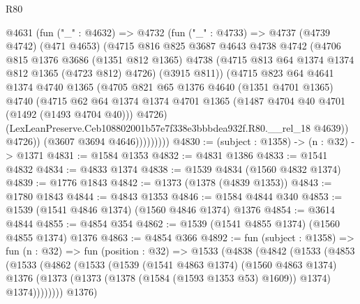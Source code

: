 \begin{lexlean}{R80}
\begin{coremodule}
              @4631
                (fun ("_" : @4632) =>
                @4732
                  (fun ("_" : @4733) =>
                  @4737
                    (@4739 @4742)
                    (@471 @4653)
                    (@4715
                      @816
                      @825
                      @3687
                      @4643
                      @4738
                      @4742
                      (@4706
                        @815
                        @1376
                        @3686
                        (@1351 @812 @1365)
                        @4738
                        (@4715 @813 @64 @1374 @1374 @812 @1365 (@4723 @812) @4726)
                        (@3915 @811))
                      (@4715
                        @823
                        @64
                        @4641
                        @1374
                        @4740
                        @1365
                        (@4705
                          @821
                          @65
                          @1376
                          @4640
                          (@1351 @4701 @1365)
                          @4740
                          (@4715
                            @62
                            @64
                            @1374
                            @1374
                            @4701
                            @1365
                            (@1487 @4704 @40 @4701 (@1492 (@1493 @4704 @40)))
                            @4726)
                          (LexLeanPreserve.Ceb108802001b57e7f338e3bbbdea932f.R80.__rel_18 @4639))
                        @4726))
                    (@3607 @3694 @4646)))))))))
@4830 := (subject : @1358) -> (n : @32) -> @1371
@4831 := @1584 @1353
@4832 := @4831 @1386
@4833 := @1541 @4832
@4834 := @4833 @1374
@4838 := @1539 @4834 (@1560 @4832 @1374)
@4839 := @1776 @1843
@4842 := @1373 (@1378 (@4839 @1353))
@4843 := @1780 @1843
@4844 := @4843 @1353
@4846 := @1584 @4844 @340
@4853 := @1539 (@1541 @4846 @1374) (@1560 @4846 @1374) @1376
@4854 := @3614 @4844
@4855 := @4854 @354
@4862 := @1539 (@1541 @4855 @1374) (@1560 @4855 @1374) @1376
@4863 := @4854 @366
@4892 := fun (subject : @1358) =>
  fun (n : @32) =>
  fun (position : @32) =>
  @1533
    (@4838
      (@4842
        (@1533
          (@4853
            (@1533
              (@4862
                (@1533
                  (@1539
                    (@1541 @4863 @1374)
                    (@1560 @4863 @1374)
                    @1376
                    (@1373 (@1373 (@1378 (@1584 (@1593 @1353 @53) @1609)) @1374) @1374))))))))
      @1376)

\end{coremodule}
\end{lexlean}
